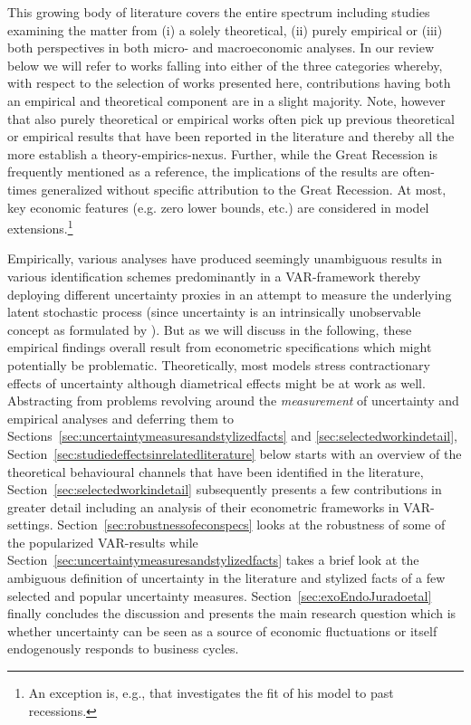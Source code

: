 \documentclass[a4paper,11pt,listof=nochaptergap,oneside,pointednumbers,bibtotoc,bigheadings,liststotoc,hidelinks]{scrbook}
\theoremstyle{mysatz}
\theoremstyle{mydefinition}
\theoremstyle{mytheorem}
\theoremstyle{mybemerkung}
\begin{document}
This growing body of literature covers the entire spectrum including studies examining the matter from (i) a solely theoretical, (ii) purely empirical or (iii) both perspectives in both micro- and macroeconomic analyses. In our review below we will refer to works falling into either of the three categories whereby, with respect to the selection of works presented here, contributions having both an empirical and theoretical component are in a slight majority.  Note, however that also purely theoretical or empirical works often pick up previous theoretical or empirical results that have been reported in the literature and thereby all the more establish a theory-empirics-nexus. Further, while the Great Recession is frequently mentioned as a reference, the implications of the results are often-times generalized without specific attribution to the Great Recession. At most, key economic features (e.g. zero lower bounds, etc.) are considered in model extensions.\footnote{An exception is, e.g., \citet{schaal:17} that investigates the fit of his model to past recessions.} 

Empirically, various analyses have produced seemingly unambiguous results in various identification schemes predominantly in a VAR-framework thereby deploying different uncertainty proxies in an attempt to measure the underlying latent stochastic process (since uncertainty is an intrinsically unobservable concept as formulated by \citealp{bloom:14}). But as we will discuss in the following, these empirical findings overall result from econometric specifications which might potentially be problematic. Theoretically, most models stress contractionary effects of uncertainty although diametrical effects might be at work as well. Abstracting from problems revolving around the \textit{measurement} of uncertainty and empirical analyses and deferring them to Sections~\ref{sec:uncertaintymeasuresandstylizedfacts} and \ref{sec:selectedworkindetail}, Section~\ref{sec:studiedeffectsinrelatedliterature} below starts with an overview of the theoretical behavioural channels that have been identified in the literature, Section~\ref{sec:selectedworkindetail} subsequently presents a few contributions in greater detail including an analysis of their econometric frameworks in VAR-settings. Section~\ref{sec:robustnessofeconspecs} looks at the robustness of some of the popularized VAR-results while Section~\ref{sec:uncertaintymeasuresandstylizedfacts} takes a brief look at the ambiguous definition of uncertainty in the literature and stylized facts of a few selected and popular uncertainty measures. Section~\ref{sec:exoEndoJuradoetal} finally concludes the discussion and presents the main research question which is whether uncertainty can be seen as a source of economic fluctuations or itself endogenously responds to business cycles.
\end{document}
